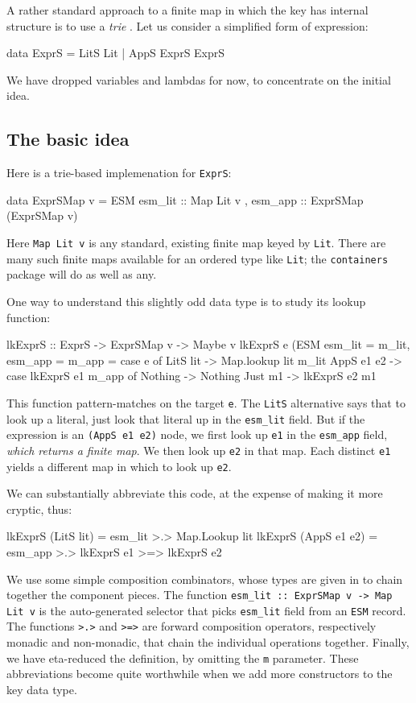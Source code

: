 \documentclass[acmsmall]{acmart}
\theoremstyle{theorem}
\theoremstyle{definition}
\theoremstyle{remark}
\begin{document}
A rather standard approach to a finite map in which the key has internal structure
is to use a \emph{trie} \cite{trie}.  Let us consider a simplified
form of expression:
\begin{code}
data ExprS = LitS Lit | AppS ExprS ExprS
\end{code}
We have dropped variables and lambdas for now, to concentrate on the initial idea.

\subsection{The basic idea} \label{sec:basic} \label{sec:alter}

Here is a trie-based implemenation for \lstinline{ExprS}:
\begin{code}
data ExprSMap v = ESM { esm_lit :: Map Lit v
                      , esm_app :: ExprSMap (ExprSMap v) }
\end{code}
Here \lstinline{Map Lit v} is any standard, existing finite map keyed by \lstinline{Lit}.
There are many such finite maps available for an ordered type like \lstinline{Lit};
the \lstinline{containers} package will do as well as any.

One way to understand this slightly odd data type is to study its lookup function:
\begin{code}
lkExprS :: ExprS -> ExprSMap v -> Maybe v
lkExprS e (ESM { esm_lit = m_lit, esm_app = m_app }
  = case e of
     LitS lit   -> Map.lookup lit m_lit
     AppS e1 e2 -> case lkExprS e1 m_app of
                     Nothing -> Nothing
                     Just m1 -> lkExprS e2 m1
\end{code}
This function pattern-matches on the target \lstinline{e}.  The \lstinline{LitS} alternative
says that to look up a literal, just look that literal up in the \lstinline{esm_lit} field.
But if the expression is an \lstinline{(AppS e1 e2)} node, we first look up \lstinline{e1}
in the \lstinline{esm_app} field, \emph{which returns a finite map}.  We then look up \lstinline{e2}
in that map.  Each distinct \lstinline{e1} yields a different map in which to look up \lstinline{e2}.

We can substantially abbreviate this code, at the expense of making it more cryptic, thus:
\begin{code}
lkExprS (LitS lit)   = esm_lit >.> Map.Lookup lit
lkExprS (AppS e1 e2) = esm_app >.> lkExprS e1 >=> lkExprS e2
\end{code}
We use some simple composition combinators, whose types are given in 
to chain together the component pieces.  The function \lstinline{esm_lit :: ExprSMap v -> Map Lit v}
is the auto-generated selector that picks \lstinline{esm_lit} field from an \lstinline{ESM} record.
The functions \lstinline{>.>} and \lstinline{>=>} are forward composition
operators, respectively monadic and non-monadic, that chain the individual operations together.
Finally, we have eta-reduced the definition, by omitting the \lstinline{m} parameter.
These abbreviations become quite worthwhile when we add more constructors to the key data type.
\end{document}
